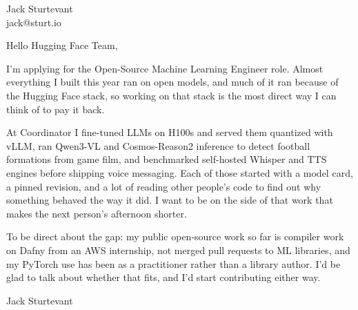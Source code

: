 \documentclass[11pt]{article}
\begin{document}
\raggedright

{\namefont\fontsize{20pt}{24pt}\selectfont Jack Sturtevant}\\[-0.3em]
jack@sturt.io

\vspace{1.2em}

Hello Hugging Face Team,

I'm applying for the Open-Source Machine Learning Engineer role. Almost everything I built this year ran on open models, and much of it ran because of the Hugging Face stack, so working on that stack is the most direct way I can think of to pay it back.

At Coordinator I fine-tuned LLMs on H100s and served them quantized with vLLM, ran Qwen3-VL and Cosmos-Reason2 inference to detect football formations from game film, and benchmarked self-hosted Whisper and TTS engines before shipping voice messaging. Each of those started with a model card, a pinned revision, and a lot of reading other people's code to find out why something behaved the way it did. I want to be on the side of that work that makes the next person's afternoon shorter.

To be direct about the gap: my public open-source work so far is compiler work on Dafny from an AWS internship, not merged pull requests to ML libraries, and my PyTorch use has been as a practitioner rather than a library author. I'd be glad to talk about whether that fits, and I'd start contributing either way.

\vspace{0.6em}
Jack Sturtevant
\end{document}
